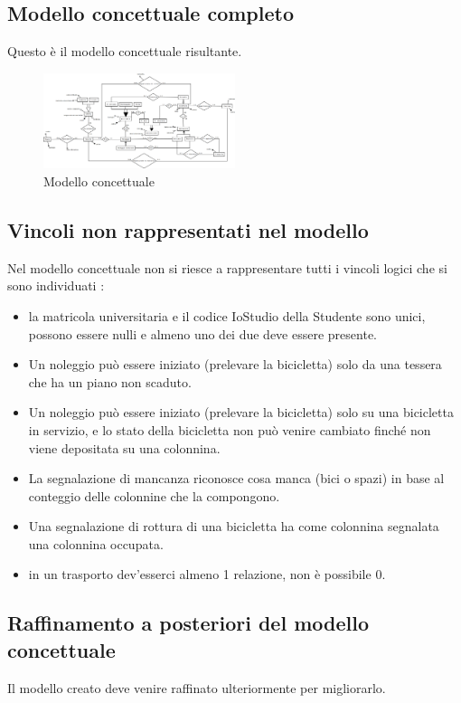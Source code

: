 \documentclass[a4paper,twoside]{article}
\begin{document}
\subsection{Modello concettuale completo}
Questo è il modello concettuale risultante.
\begin{figure}[H]
 \centering
  \includegraphics[width=0.5\textwidth]{Immagini-Grafici/Concettuale14.png}
\caption{Modello concettuale}
\end{figure}

\subsection{Vincoli non rappresentati nel modello}
Nel modello concettuale non si riesce a rappresentare tutti i vincoli logici che si sono individuati :
\begin{itemize} %
 \item la matricola universitaria e il codice IoStudio della Studente sono unici, possono essere nulli e almeno uno dei due deve essere presente.
 \item Un noleggio può essere iniziato (prelevare la bicicletta) solo da una tessera che ha un piano non scaduto.
 \item Un noleggio può essere iniziato (prelevare la bicicletta) solo su una bicicletta in servizio, e lo stato della bicicletta non può venire cambiato finché non viene depositata su una colonnina.
 \item La segnalazione di mancanza riconosce cosa manca (bici o spazi) in base al conteggio delle colonnine che la compongono.
 \item Una segnalazione di rottura di una bicicletta ha come colonnina segnalata una colonnina occupata.
 \item in un trasporto dev'esserci almeno 1 relazione, non è possibile 0.
\end{itemize}

\subsection{Raffinamento a posteriori del modello concettuale}
Il modello creato deve venire raffinato ulteriormente per migliorarlo.\newline
\end{document}
